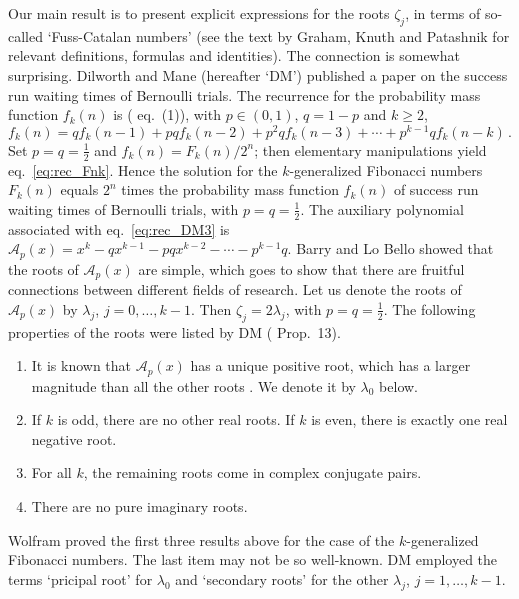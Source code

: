 \documentclass[review]{elsarticle}
\theoremstyle{plain}
\begin{document}
Our main result is to present explicit expressions for the roots $\zeta_j$,
in terms of so-called `Fuss-Catalan numbers'
(see the text by Graham, Knuth and Patashnik \cite{GrahamKnuthPatashnik}
for relevant definitions, formulas and identities).
The connection is somewhat surprising.
Dilworth and Mane \cite{DM3} (hereafter `DM') published a paper on the success run waiting times of Bernoulli trials.
The recurrence for the probability mass function $f_k(n)$
is (\cite{DM3} eq.~(1)), with $p\in(0,1)$, $q=1-p$ and $k\ge2$,
\begin{equation}
\label{eq:rec_DM3}
f_k(n) = qf_k(n-1) +pqf_k(n-2) +p^2qf_k(n-3) +\cdots +p^{k-1}qf_k(n-k) \,.
\end{equation}
Set $p=q=\frac12$ and $f_k(n) = F_k(n)/2^n$; then elementary manipulations yield eq.~\eqref{eq:rec_Fnk}.
Hence the solution for the $k$-generalized Fibonacci numbers $F_k(n)$
equals $2^n$ times the probability mass function $f_k(n)$ of success run waiting times of Bernoulli trials,
with $p=q=\frac12$.
The auxiliary polynomial associated with eq.~\eqref{eq:rec_DM3} is
$\mathcal{A}_p(x) = x^k -qx^{k-1} -pqx^{k-2} -\cdots -p^{k-1}q$.
Barry and Lo Bello \cite{BarryLoBello} showed that the roots of $\mathcal{A}_p(x)$ are simple,
which goes to show that there are fruitful connections between different fields of research.
Let us denote the roots of $\mathcal{A}_p(x)$ by $\lambda_j$, $j=0,\dots,k-1$.
Then $\zeta_j=2\lambda_j$, with $p=q=\frac12$.
The following properties of the roots were listed by DM (\cite{DM3} Prop.~13).
\begin{enumerate}
\item
It is known that $\mathcal{A}_p(x)$ has a unique positive root, which has a larger magnitude than all the other roots \cite{Feller}.
We denote it by $\lambda_0$ below.
\item
If $k$ is odd, there are no other real roots. If $k$ is even, there is exactly one real negative root.
\item
For all $k$, the remaining roots come in complex conjugate pairs.
\item
There are no pure imaginary roots.
\end{enumerate}
Wolfram \cite{Wolfram} proved the first three results above for the case of the $k$-generalized Fibonacci numbers.
The last item may not be so well-known.
DM employed the terms `pricipal root' for $\lambda_0$
and `secondary roots' for the other $\lambda_j$, $j=1,\dots,k-1$.
\end{document}
